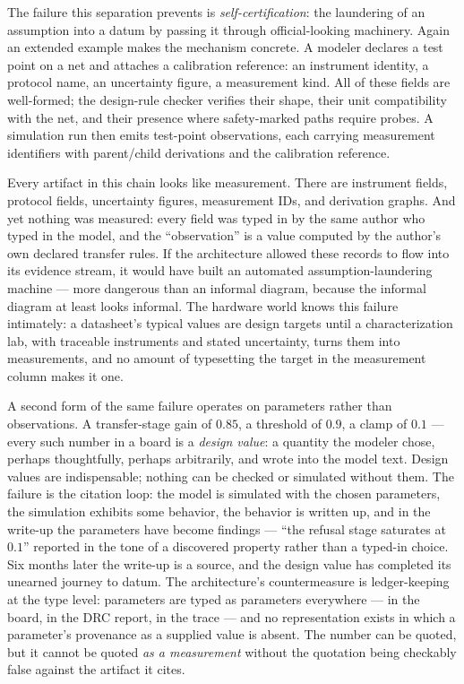 The failure this separation prevents is \emph{self-certification}: the
laundering of an assumption into a datum by passing it through
official-looking machinery. Again an extended example makes the mechanism
concrete. A modeler declares a test point on a net and attaches a
calibration reference: an instrument identity, a protocol name, an
uncertainty figure, a measurement kind. All of these fields are well-formed;
the design-rule checker verifies their shape, their unit compatibility with
the net, and their presence where safety-marked paths require probes. A
simulation run then emits test-point observations, each carrying measurement
identifiers with parent/child derivations and the calibration reference.

Every artifact in this chain looks like measurement. There are instrument
fields, protocol fields, uncertainty figures, measurement IDs, and derivation
graphs. And yet nothing was measured: every field was typed in by the same
author who typed in the model, and the ``observation'' is a value computed by
the author's own declared transfer rules. If the architecture allowed these
records to flow into its evidence stream, it would have built an automated
assumption-laundering machine --- more dangerous than an informal diagram,
because the informal diagram at least looks informal. The hardware world
knows this failure intimately: a datasheet's typical values are design
targets until a characterization lab, with traceable instruments and stated
uncertainty, turns them into measurements, and no amount of typesetting the
target in the measurement column makes it one.

A second form of the same failure operates on parameters rather than
observations. A transfer-stage gain of $0.85$, a threshold of $0.9$, a
clamp of $0.1$ --- every such number in a board is a \emph{design value}: a
quantity the modeler chose, perhaps thoughtfully, perhaps arbitrarily, and
wrote into the model text. Design values are indispensable; nothing can be
checked or simulated without them. The failure is the citation loop: the
model is simulated with the chosen parameters, the simulation exhibits some
behavior, the behavior is written up, and in the write-up the parameters
have become findings --- ``the refusal stage saturates at $0.1$'' reported
in the tone of a discovered property rather than a typed-in choice. Six
months later the write-up is a source, and the design value has completed
its unearned journey to datum. The architecture's countermeasure is
ledger-keeping at the type level: parameters are typed as parameters
everywhere --- in the board, in the DRC report, in the trace --- and no
representation exists in which a parameter's provenance as a supplied value
is absent. The number can be quoted, but it cannot be quoted \emph{as a
measurement} without the quotation being checkably false against the
artifact it cites.

